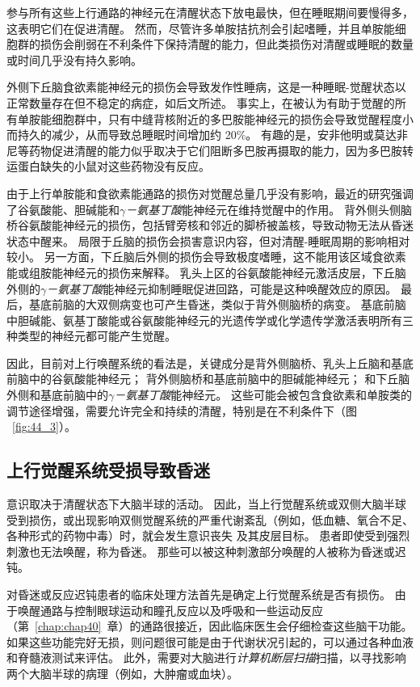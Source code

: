 参与所有这些上行通路的神经元在清醒状态下放电最快，但在睡眠期间要慢得多，这表明它们在促进清醒。
然而，尽管许多单胺拮抗剂会引起嗜睡，并且单胺能细胞群的损伤会削弱在不利条件下保持清醒的能力，但此类损伤对清醒或睡眠的数量或时间几乎没有持久影响。


外侧下丘脑食欲素能神经元的损伤会导致发作性睡病，这是一种睡眠-觉醒状态以正常数量存在但不稳定的病症，如后文所述。
事实上，在被认为有助于觉醒的所有单胺能细胞群中，只有中缝背核附近的多巴胺能神经元的损伤会导致觉醒程度小而持久的减少，从而导致总睡眠时间增加约 20\%。
有趣的是，安非他明或莫达非尼等药物促进清醒的能力似乎取决于它们阻断多巴胺再摄取的能力，因为多巴胺转运蛋白缺失的小鼠对这些药物没有反应。


由于上行单胺能和食欲素能通路的损伤对觉醒总量几乎没有影响，最近的研究强调了谷氨酸能、胆碱能和\textit{$\gamma$－氨基丁酸}能神经元在维持觉醒中的作用。
背外侧头侧脑桥谷氨酸能神经元的损伤，包括臂旁核和邻近的脚桥被盖核，导致动物无法从昏迷状态中醒来。
局限于丘脑的损伤会损害意识内容，但对清醒-睡眠周期的影响相对较小。
另一方面，下丘脑后外侧的损伤会导致极度嗜睡，这不能用该区域食欲素能或组胺能神经元的损伤来解释。
乳头上区的谷氨酸能神经元激活皮层，下丘脑外侧的\textit{$\gamma$－氨基丁酸}能神经元抑制睡眠促进回路，可能是这种唤醒效应的原因。
最后，基底前脑的大双侧病变也可产生昏迷，类似于背外侧脑桥的病变。
基底前脑中胆碱能、氨基丁酸能或谷氨酸能神经元的光遗传学或化学遗传学激活表明所有三种类型的神经元都可能产生觉醒。


因此，目前对上行唤醒系统的看法是，关键成分是背外侧脑桥、乳头上丘脑和基底前脑中的谷氨酸能神经元；
背外侧脑桥和基底前脑中的胆碱能神经元；
和下丘脑外侧和基底前脑中的\textit{$\gamma$－氨基丁酸}能神经元。
这些可能会被包含食欲素和单胺类的调节途径增强，需要允许完全和持续的清醒，特别是在不利条件下（图 ~\ref{fig:44_3}）。



\subsection{上行觉醒系统受损导致昏迷}

意识取决于清醒状态下大脑半球的活动。
因此，当上行觉醒系统或双侧大脑半球受到损伤，或出现影响双侧觉醒系统的严重代谢紊乱（例如，低血糖、氧合不足、各种形式的药物中毒）时，就会发生意识丧失 及其皮层目标。
患者即使受到强烈刺激也无法唤醒，称为昏迷。
那些可以被这种刺激部分唤醒的人被称为昏迷或迟钝。


对昏迷或反应迟钝患者的临床处理方法首先是确定上行觉醒系统是否有损伤。
由于唤醒通路与控制眼球运动和瞳孔反应以及呼吸和一些运动反应（第~\ref{chap:chap40}~章）的通路很接近，因此临床医生会仔细检查这些脑干功能。
如果这些功能完好无损，则问题很可能是由于代谢状况引起的，可以通过各种血液和脊髓液测试来评估。
此外，需要对大脑进行\textit{计算机断层扫描}扫描，以寻找影响两个大脑半球的病理（例如，大肿瘤或血块）。



